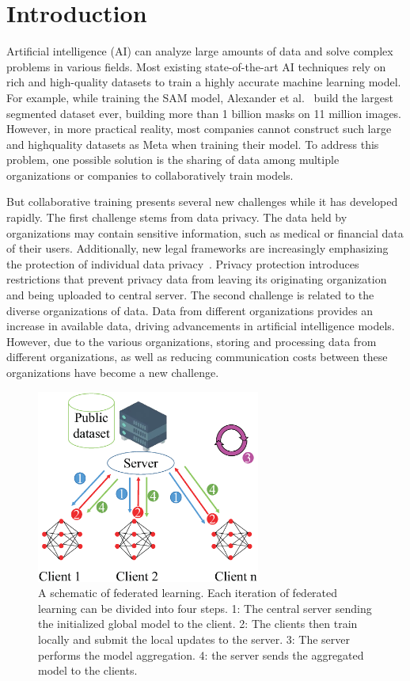 \documentclass[pdflatex,sn-mathphys-num]{sn-jnl}%
\theoremstyle{thmstyleone}%
\theoremstyle{thmstyletwo}%
\theoremstyle{thmstylethree}%
\begin{document}
\section{Introduction}
Artificial intelligence (AI) can analyze large amounts
of data and solve complex problems in various fields.
Most existing state-of-the-art AI techniques rely on
rich and high-quality datasets to train a highly accurate
machine learning model. For example, while training
the SAM model, Alexander et al.~\cite{kirillov2023segment} build the largest
segmented dataset ever, building more than 1 billion
masks on 11 million images. However, in more practical reality,
most companies cannot construct such large and highquality datasets as Meta when training their model. To
address this problem, one possible solution is the sharing
of data among multiple organizations or companies to
collaboratively train models.

But collaborative training presents several new challenges while it has developed rapidly.
The first challenge stems from data privacy. The data held
by organizations may contain sensitive information, such
as medical or financial data of their users. Additionally,
new legal frameworks are increasingly emphasizing the
protection of individual data privacy~\cite{voigt2017eu}. Privacy protection introduces restrictions that prevent privacy data from
leaving its originating organization and being uploaded
to central server. The second challenge is related to the
diverse organizations of data. Data from different organizations provides an increase in available data, driving
advancements in artificial intelligence models. However,
due to the various organizations, storing and processing
data from different organizations, as well as reducing communication costs between these organizations have
become a new challenge.
\begin{figure}[t]
	\centering

	\includegraphics[width=1.0\linewidth,height=2.5in]{output/fig1.eps}
	\caption{A schematic of federated learning.
		Each iteration of federated learning can be divided into four steps.
		1: The central server sending the initialized global model to the client. 2: The
		clients then train locally and submit the local updates to the server. 3: The server performs the model aggregation.
		4: the server sends the aggregated model to the clients.}
	\label{fig1}
\end{figure}  
\end{document}
